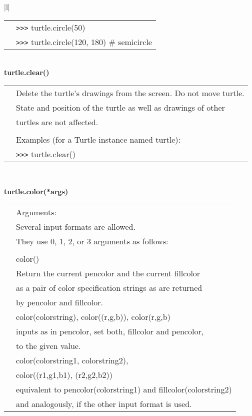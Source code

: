\begin{center}
{\begin{tabular}{|l|}
\begin{tabular}{p{0.25in}p{4in}}
&        \verb+>+\verb+>+\verb+>+ turtle.circle(50) \\
&        \verb+>+\verb+>+\verb+>+ turtle.circle(120, 180)  \# semicircle \\
\end{tabular} \\ \hline
{\bf    turtle.clear()} \\
   \begin{tabular}{p{0.25in}p{4in}}
&        Delete the turtle's drawings from the screen. Do not move turtle. \\
&        State and position of the turtle as well as drawings of other \\
&        turtles are not affected. \\
&  \\
&        Examples (for a Turtle instance named turtle): \\
&        \verb+>+\verb+>+\verb+>+ turtle.clear() \\
\end{tabular} \\ \hline

{\bf    turtle.color(*args)} \\
   \begin{tabular}{p{0.25in}p{4in}}
&        Arguments: \\
&        Several input formats are allowed. \\
&        They use 0, 1, 2, or 3 arguments as follows: \\
&  \\
&        color() \\
&            Return the current pencolor and the current fillcolor \\
&            as a pair of color specification strings as are returned \\
&            by pencolor and fillcolor. \\
&        color(colorstring), color((r,g,b)), color(r,g,b) \\
&            inputs as in pencolor, set both, fillcolor and pencolor, \\
&            to the given value. \\
&        color(colorstring1, colorstring2), \\
&        color((r1,g1,b1), (r2,g2,b2)) \\
&            equivalent to pencolor(colorstring1) and fillcolor(colorstring2) \\
&            and analogously, if the other input format is used. \\ 
\end{tabular} \\ \hline
\end{tabular}}
\end{center}
